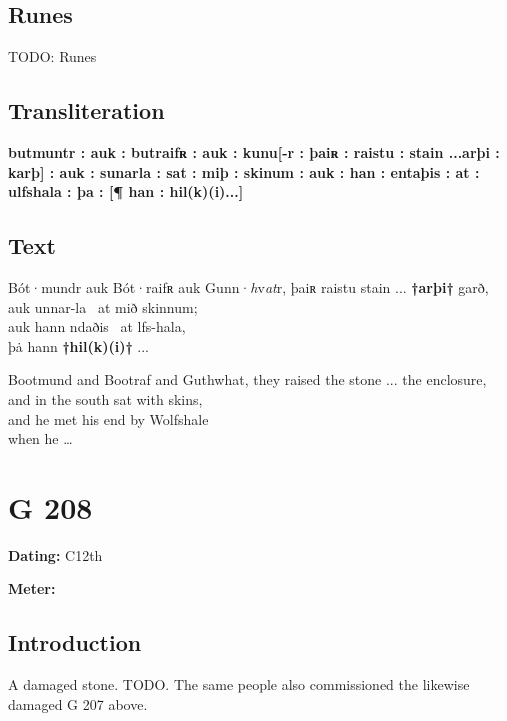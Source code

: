 \subsection{Runes}

TODO: Runes%

\subsection{Transliteration}

\textbf{butmuntr : auk : butraifʀ : auk : kunu[-r : þaiʀ : raistu : stain ...arþi : karþ] : auk : sunarla : sat : miþ : skinum : auk : han : entaþis : at : ulfshala : þa : [¶ han : hil(k)(i)...]}

\subsection{Text}

\bpg\bpa[0]%
Bót·mundr auk Bót·raifʀ auk Gunn·\emph{h}v\emph{at}r, þaiʀ raistu stain ... \textbf{†arþi†} garð, \\
auk unnar-la \hld\ at mið skinnum; \\
auk hann ndaðis \hld\ at lfs-hala, \\
þȧ hann \textbf{†hil(k)(i)†} ...\epa

\bpb Bootmund and Bootraf and Guthwhat, they raised the stone ... the enclosure, \\
and in the south sat with skins, \\
and he met his end by Wolfshale \\
when he \dots\epb\epg

\sectionline\clearpage


\section{G 208}

\begin{flushright}%
\textbf{Dating:} C12th

\textbf{Meter:} \Fornyrdislag
\end{flushright}%

\subsection{Introduction}

A damaged stone. TODO.  The same people also commissioned the likewise damaged G 207 above.

